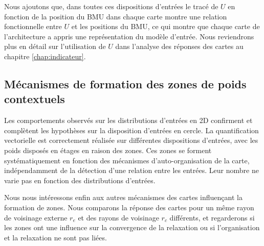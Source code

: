 \documentclass[../main]{subfiles}
\begin{document}
Nous ajoutons que, dans toutes ces dispositions d'entrées le tracé de $U$ en fonction de la position du BMU dans chaque carte montre une relation fonctionnelle entre $U$ et les positions du BMU, ce qui montre que chaque carte de l'architecture a appris une représentation du modèle d'entrée. Nous reviendrons plus en détail sur l'utilisation de $U$ dans l'analyse des réponses des cartes au chapitre \ref{chap:indicateur}.



\subsection{Mécanismes de formation des zones de poids contextuels}

Les comportements observés sur les distributions d'entrées en 2D confirment et complètent les hypothèses sur la disposition d'entrées en cercle. La quantification vectorielle est correctement réalisée sur différentes dispositions d'entrées, avec les poids disposés en étages en raison des zones. Ces zones se forment systématiquement en fonction des mécanismes d'auto-organisation de la carte, indépendamment de la détection d'une relation entre les entrées. Leur nombre ne varie pas en fonction des distributions d'entrées.

Nous nous intéressons enfin aux autres mécanismes des cartes influençant la formation de zones. Nous comparons la réponse des cartes pour un même rayon de voisinage externe $r_e$ et des rayons de voisinage $r_c$ différents, et regarderons si les zones ont une influence sur la convergence de la relaxation ou si l'organisation et la relaxation ne sont pas liées.

\end{document}
